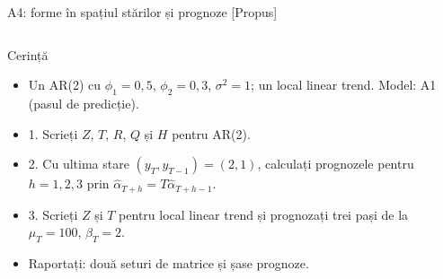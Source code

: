 \begin{frame}{A4: forme în spațiul stărilor și prognoze [Propus]}
\propsub
\itemsize{\scriptsize}
\begin{columns}[T]
\begin{column}{\taskw}
\begin{block}{Cerință}
\begin{itemize}
    \item Un AR(2) cu $\phi_1 = 0{,}5$, $\phi_2 = 0{,}3$, $\sigma^2 = 1$; un local linear trend. Model: A1 (pasul de predicție).
    \item 1. Scrieți $Z$, $T$, $R$, $Q$ și $H$ pentru AR(2).
    \item 2. Cu ultima stare $(y_T, y_{T-1}) = (2, 1)$, calculați prognozele pentru $h = 1, 2, 3$ prin $\hat\alpha_{T+h} = T\hat\alpha_{T+h-1}$.
    \item 3. Scrieți $Z$ și $T$ pentru local linear trend și prognozați trei pași de la $\mu_T = 100$, $\beta_T = 2$.
    \item Raportați: două seturi de matrice și șase prognoze.
\end{itemize}
\end{block}
\end{column}
\begin{column}{\solw}
\end{column}
\end{columns}
\end{frame}


